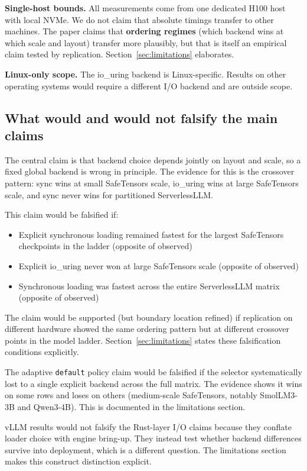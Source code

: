 \textbf{Single-host bounds.} All measurements come from one dedicated H100 host with local NVMe. We do not claim that absolute timings transfer to other machines. The paper claims that \textbf{ordering regimes} (which backend wins at which scale and layout) transfer more plausibly, but that is itself an empirical claim tested by replication. Section~\ref{sec:limitations} elaborates.

\textbf{Linux-only scope.} The io\_uring backend is Linux-specific. Results on other operating systems would require a different I/O backend and are outside scope.

\subsection{What would and would not falsify the main claims}

The central claim is that backend choice depends jointly on layout and scale, so a fixed global backend is wrong in principle. The evidence for this is the crossover pattern: sync wins at small SafeTensors scale, io\_uring wins at large SafeTensors scale, and sync never wins for partitioned ServerlessLLM.

This claim would be falsified if:
\begin{itemize}
\item Explicit synchronous loading remained fastest for the largest SafeTensors checkpoints in the ladder (opposite of observed)
\item Explicit io\_uring never won at large SafeTensors scale (opposite of observed)
\item Synchronous loading was fastest across the entire ServerlessLLM matrix (opposite of observed)
\end{itemize}

The claim would be supported (but boundary location refined) if replication on different hardware showed the same ordering pattern but at different crossover points in the model ladder. Section~\ref{sec:limitations} states these falsification conditions explicitly.

The adaptive \texttt{default} policy claim would be falsified if the selector systematically lost to a single explicit backend across the full matrix. The evidence shows it wins on some rows and loses on others (medium-scale SafeTensors, notably SmolLM3-3B and Qwen3-4B). This is documented in the limitations section.

vLLM results would not falsify the Rust-layer I/O claims because they conflate loader choice with engine bring-up. They instead test whether backend differences survive into deployment, which is a different question. The limitations section makes this construct distinction explicit.

